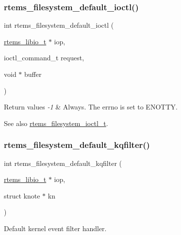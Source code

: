 \subsubsection{\texorpdfstring{rtems\_filesystem\_default\_ioctl()}{rtems\_filesystem\_default\_ioctl()}}
{\footnotesize\ttfamily int rtems\+\_\+filesystem\+\_\+default\+\_\+ioctl (\begin{DoxyParamCaption}\item[{\mbox{\hyperlink{structrtems__libio__tt}{rtems\+\_\+libio\+\_\+t}} $\ast$}]{iop,  }\item[{ioctl\+\_\+command\+\_\+t}]{request,  }\item[{void $\ast$}]{buffer }\end{DoxyParamCaption})}


\begin{DoxyRetVals}{Return values}
{\em -\/1} & Always. The errno is set to E\+N\+O\+T\+TY.\\
\hline
\end{DoxyRetVals}
\begin{DoxySeeAlso}{See also}
\mbox{\hyperlink{group__LibIOFSHandler_ga04ace53d3f0513746d5241dc94c76387}{rtems\+\_\+filesystem\+\_\+ioctl\+\_\+t}}. 
\end{DoxySeeAlso}
\mbox{\label{group__LibIOFSHandler_ga9616b979a36fc433734c0e79e2c13f3d}} 
\subsubsection{\texorpdfstring{rtems\_filesystem\_default\_kqfilter()}{rtems\_filesystem\_default\_kqfilter()}}
{\footnotesize\ttfamily int rtems\+\_\+filesystem\+\_\+default\+\_\+kqfilter (\begin{DoxyParamCaption}\item[{\mbox{\hyperlink{structrtems__libio__tt}{rtems\+\_\+libio\+\_\+t}} $\ast$}]{iop,  }\item[{struct knote $\ast$}]{kn }\end{DoxyParamCaption})}



Default kernel event filter handler. 



